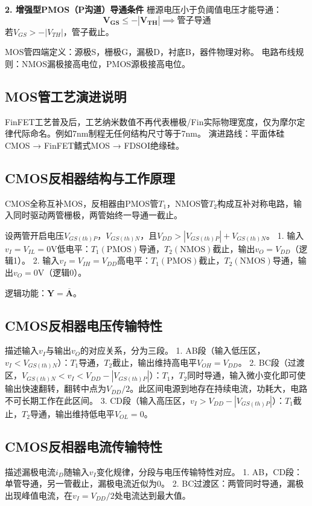 \textbf{2. 增强型PMOS（P沟道）导通条件}
栅源电压小于负阈值电压才能导通：
\[
\boldsymbol{V_{GS} \le -|V_{TH}| \implies \text{管子导通}}
\]
若\(V_{GS}>-|V_{TH}|\)，管子截止。

MOS管四端定义：源极S，栅极G，漏极D，衬底B，器件物理对称。
电路布线规则：NMOS漏极接高电位，PMOS源极接高电位。

\subsection{MOS管工艺演进说明}
FinFET工艺普及后，工艺纳米数值不再代表栅极/Fin实际物理宽度，仅为摩尔定律代际命名。例如7nm制程无任何结构尺寸等于7nm。
演进路线：平面体硅CMOS → FinFET鳍式MOS → FDSOI绝缘硅。

\subsection{CMOS反相器结构与工作原理}
CMOS全称互补MOS，反相器由PMOS管\(T_1\)，NMOS管\(T_2\)构成互补对称电路，输入同时驱动两管栅极，两管始终一导通一截止。

设两管开启电压\(V_{GS(th)P}\)，\(V_{GS(th)N}\)，且\(V_{DD}>|V_{GS(th)P}|+V_{GS(th)N}\)。
1. 输入\(v_I=V_{IL}=0\mathrm{V}\)低电平：\(T_1(\text{PMOS})\)导通，\(T_2(\text{NMOS})\)截止，输出\(v_O=V_{DD}\)（逻辑1）。
2. 输入\(v_I=V_{IH}=V_{DD}\)高电平：\(T_1(\text{PMOS})\)截止，\(T_2(\text{NMOS})\)导通，输出\(v_O=0\mathrm{V}\)（逻辑0）。

逻辑功能：\(\boldsymbol{Y=\overline{A}}\)。

\subsection{CMOS反相器电压传输特性}
描述输入\(v_I\)与输出\(v_O\)的对应关系，分为三段。
1. AB段（输入低压区，\(v_I < V_{GS(th)N}\)）：\(T_1\)导通，\(T_2\)截止，输出维持高电平\(V_{OH}=V_{DD}\)。
2. BC段（过渡区，\(V_{GS(th)N} < v_I < V_{DD}-|V_{GS(th)P}|\)）：\(T_1\)，\(T_2\)同时导通，输入微小变化即可使输出快速翻转，翻转中点为\(V_{DD}/2\)。此区间电源到地存在持续电流，功耗大，电路不可长期工作在此区间。
3. CD段（输入高压区，\(v_I > V_{DD}-|V_{GS(th)P}|\)）：\(T_1\)截止，\(T_2\)导通，输出维持低电平\(V_{OL}=0\)。

\subsection{CMOS反相器电流传输特性}
描述漏极电流\(i_D\)随输入\(v_I\)变化规律，分段与电压传输特性对应。
1. AB，CD段：单管导通，另一管截止，漏极电流近似为0。
2. BC过渡区：两管同时导通，漏极出现峰值电流，在\(v_I=V_{DD}/2\)处电流达到最大值。

